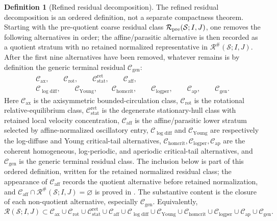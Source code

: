 \documentclass[11pt]{amsart}
\numberwithin{equation}{section}
\theoremstyle{plain}
\theoremstyle{definition}
\newtheorem{definition}[definition]{Definition}
\theoremstyle{remark}
\newcommand{\calS}{\mathcal S}
\newcommand{\calR}{\mathcal R}
\newcommand{\Cax}{\mathcal C_{\mathrm{ax}}}
\newcommand{\Crot}{\mathcal C_{\mathrm{rot}}}
\newcommand{\Cstat}{\mathcal C_{\mathrm{stat}}^{\mathrm{ret}}}
\newcommand{\Caff}{\mathcal C_{\mathrm{aff}}}
\newcommand{\Cgen}{\mathcal C_{\mathrm{gen}}}
\newcommand{\Chomcrit}{\mathcal C_{\mathrm{homcrit}}}
\newcommand{\Clogper}{\mathcal C_{\mathrm{logper}}}
\newcommand{\Capcrit}{\mathcal C_{\mathrm{ap}}}
\newcommand{\Cyoung}{\mathcal C_{\mathrm{Young}}}
\newcommand{\Clogdiff}{\mathcal C_{\log\mathrm{diff}}}
\begin{document}
\begin{definition}[Refined residual decomposition]
\label{def:refined-decomposition}
The refined residual decomposition is an ordered definition, not a separate
compactness theorem.  Starting with the pre-quotient coarse residual class
\(\calR_{\rm pre}(\calS;I,J)\), one removes the following alternatives in
order; the affine/parasitic alternative is then recorded as a quotient stratum
with no retained normalized representative in \(\calR^\#(\calS;I,J)\).  After
the first nine alternatives have been removed, whatever remains is by definition
the generic terminal residual \(\Cgen\):
\[
\begin{gathered}
   \Cax,\qquad \Crot,\qquad \Cstat,\qquad \Caff,\\
   \Clogdiff,\qquad \Cyoung,\qquad
   \Chomcrit,\qquad \Clogper,\qquad \Capcrit,\qquad \Cgen .
\end{gathered}
\]
Here \(\Cax\) is the axisymmetric bounded-circulation class, \(\Crot\) is the
rotational relative-equilibrium class, \(\Cstat\) is the degenerate
stationary-hull class with retained local velocity concentration, \(\Caff\) is the
affine/parasitic lower stratum selected by affine-normalized oscillatory entry,
\(\Clogdiff\) and \(\Cyoung\) are respectively the log-diffuse and Young
critical-tail alternatives, \(\Chomcrit,\Clogper,\Capcrit\) are the coherent
homogeneous, log-periodic, and aperiodic critical-tail alternatives, and \(\Cgen\)
is the generic terminal residual class.  The inclusion below is part of this
ordered definition, written for the retained normalized residual class; the
appearance of \(\Caff\) records the quotient alternative before retained
normalization, and \(\Caff\cap\calR^\#(\calS;I,J)=\varnothing\) is proved in
.  The substantive content is the
closure of each non-quotient alternative, especially \(\Cgen\).  Equivalently,
\begin{equation}\label{eq:complete-residual-decomposition}
   \calR(\calS;I,J)
   \subset
   \Cax\cup\Crot\cup\Cstat\cup\Caff
   \cup\Clogdiff\cup\Cyoung\cup\Chomcrit\cup\Clogper\cup\Capcrit
   \cup\Cgen .
\end{equation}
\end{definition}
\end{document}
